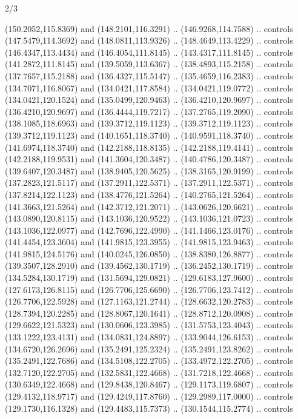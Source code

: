 \begin{flagdescription}{2/3}
\begin{scope}[xshift=0.5\flaglength,yshift=0.5\flagwidth,scale=\flagwidth/180]
\begin{scope}[y=0.8pt, x=0.8pt, yscale=-1,shift={(-168.75,-108.75)}]
  (150.2052,115.8369) and (148.2101,116.3291) .. (146.9268,114.7588) .. controls
  (147.5479,114.3692) and (148.0811,113.9326) .. (148.4649,113.4229) .. controls
  (146.4347,113.4434) and (146.4054,111.8145) .. (143.4317,111.8145) .. controls
  (141.2872,111.8145) and (139.5059,113.6367) .. (138.4893,115.2158) .. controls
  (137.7657,115.2188) and (136.4327,115.5147) .. (135.4659,116.2383) .. controls
  (134.7071,116.8067) and (134.0421,117.8584) .. (134.0421,119.0772) .. controls
  (134.0421,120.1524) and (135.0499,120.9463) .. (136.4210,120.9697) .. controls
  (136.4210,120.9697) and (136.4444,119.7217) .. (137.2765,119.2090) .. controls
  (138.1085,118.6963) and (139.3712,119.1123) .. (139.3712,119.1123) .. controls
  (139.3712,119.1123) and (140.1651,118.3740) .. (140.9591,118.3740) .. controls
  (141.6974,118.3740) and (142.2188,118.8135) .. (142.2188,119.4141) .. controls
  (142.2188,119.9531) and (141.3604,120.3487) .. (140.4786,120.3487) .. controls
  (139.6407,120.3487) and (138.9405,120.5625) .. (138.3165,120.9199) .. controls
  (137.2823,121.5117) and (137.2911,122.5371) .. (137.2911,122.5371) .. controls
  (137.8214,122.1123) and (138.4776,121.5264) .. (140.2765,121.5264) .. controls
  (141.3663,121.5264) and (142.3712,121.2071) .. (143.0626,120.6621) .. controls
  (143.0890,120.8115) and (143.1036,120.9522) .. (143.1036,121.0723) .. controls
  (143.1036,122.0977) and (142.7696,122.4990) .. (141.1466,123.0176) .. controls
  (141.4454,123.3604) and (141.9815,123.3955) .. (141.9815,123.9463) .. controls
  (141.9815,124.5176) and (140.0245,126.0850) .. (138.8380,126.8877) .. controls
  (139.3507,128.2910) and (139.4562,130.1719) .. (136.2452,130.1719) .. controls
  (134.5284,130.1719) and (131.5694,129.0821) .. (129.6183,127.9600) .. controls
  (127.6173,126.8115) and (126.7706,125.6690) .. (126.7706,123.7412) .. controls
  (126.7706,122.5928) and (127.1163,121.2744) .. (128.6632,120.2783) .. controls
  (128.7394,120.2285) and (128.8067,120.1641) .. (128.8712,120.0908) .. controls
  (129.6622,121.5323) and (130.0606,123.3985) .. (131.5753,123.4043) .. controls
  (133.1222,123.4131) and (134.0831,124.8897) .. (133.9044,126.6153) .. controls
  (134.6720,126.2696) and (135.2491,125.2324) .. (135.2491,123.8262) .. controls
  (135.2491,122.7686) and (134.5108,122.2705) .. (133.4972,122.2705) .. controls
  (132.7120,122.2705) and (132.5831,122.4668) .. (131.7218,122.4668) .. controls
  (130.6349,122.4668) and (129.8438,120.8467) .. (129.1173,119.6807) .. controls
  (129.4132,118.9717) and (129.4249,117.8760) .. (129.2989,117.0000) .. controls
  (129.1730,116.1328) and (129.4483,115.7373) .. (130.1544,115.2774) .. controls

\end{scope}
\end{scope}
\end{flagdescription}
